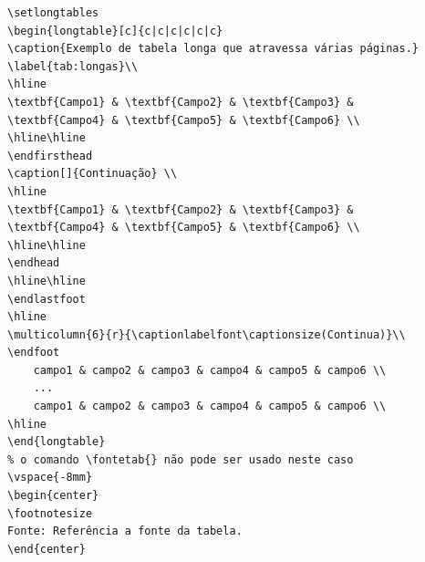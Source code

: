 \begin{verbatim}
\setlongtables
\begin{longtable}[c]{c|c|c|c|c|c}
\caption{Exemplo de tabela longa que atravessa várias páginas.}
\label{tab:longas}\\
\hline
\textbf{Campo1} & \textbf{Campo2} & \textbf{Campo3} & 
\textbf{Campo4} & \textbf{Campo5} & \textbf{Campo6} \\
\hline\hline
\endfirsthead
\caption[]{Continuação} \\
\hline
\textbf{Campo1} & \textbf{Campo2} & \textbf{Campo3} & 
\textbf{Campo4} & \textbf{Campo5} & \textbf{Campo6} \\
\hline\hline
\endhead
\hline\hline
\endlastfoot
\hline
\multicolumn{6}{r}{\captionlabelfont\captionsize(Continua)}\\
\endfoot
	campo1 & campo2 & campo3 & campo4 & campo5 & campo6 \\
	...
	campo1 & campo2 & campo3 & campo4 & campo5 & campo6 \\
\hline
\end{longtable}
% o comando \fontetab{} não pode ser usado neste caso
\vspace{-8mm}
\begin{center}
\footnotesize
Fonte: Referência a fonte da tabela.
\end{center}
\end{verbatim}


